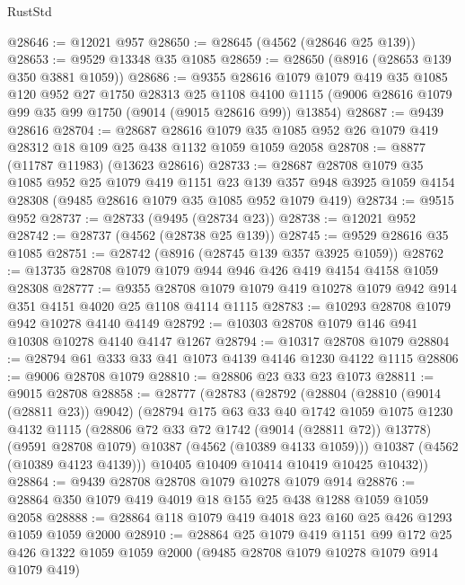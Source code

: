 \begin{lexlean}{RustStd}
\begin{coremodule}
@28646 := @12021 @957
@28650 := @28645 (@4562 (@28646 @25 @139))
@28653 := @9529 @13348 @35 @1085
@28659 := @28650 (@8916 (@28653 @139 @350 @3881 @1059))
@28686 := @9355
    @28616
    @1079
    @1079
    @419
    @35
    @1085
    @120
    @952
    @27
    @1750
    @28313
    @25
    @1108
    @4100
    @1115
    (@9006 @28616 @1079 @99 @35 @99 @1750 (@9014 (@9015 @28616 @99)) @13854)
@28687 := @9439 @28616
@28704 := @28687
    @28616
    @1079
    @35
    @1085
    @952
    @26
    @1079
    @419
    @28312
    @18
    @109
    @25
    @438
    @1132
    @1059
    @1059
    @2058
@28708 := @8877 (@11787 @11983) (@13623 @28616)
@28733 := @28687
    @28708
    @1079
    @35
    @1085
    @952
    @25
    @1079
    @419
    @1151
    @23
    @139
    @357
    @948
    @3925
    @1059
    @4154
    @28308
    (@9485 @28616 @1079 @35 @1085 @952 @1079 @419)
@28734 := @9515 @952
@28737 := @28733 (@9495 (@28734 @23))
@28738 := @12021 @952
@28742 := @28737 (@4562 (@28738 @25 @139))
@28745 := @9529 @28616 @35 @1085
@28751 := @28742 (@8916 (@28745 @139 @357 @3925 @1059))
@28762 := @13735 @28708 @1079 @1079 @944 @946 @426 @419 @4154 @4158 @1059 @28308
@28777 := @9355
    @28708
    @1079
    @1079
    @419
    @10278
    @1079
    @942
    @914
    @351
    @4151
    @4020
    @25
    @1108
    @4114
    @1115
@28783 := @10293 @28708 @1079 @942 @10278 @4140 @4149
@28792 := @10303 @28708 @1079 @146 @941 @10308 @10278 @4140 @4147 @1267
@28794 := @10317 @28708 @1079
@28804 := @28794 @61 @333 @33 @41 @1073 @4139 @4146 @1230 @4122 @1115
@28806 := @9006 @28708 @1079
@28810 := @28806 @23 @33 @23 @1073
@28811 := @9015 @28708
@28858 := @28777
    (@28783
      (@28792
        (@28804
          (@28810 (@9014 (@28811 @23)) @9042)
          (@28794
            @175
            @63
            @33
            @40
            @1742
            @1059
            @1075
            @1230
            @4132
            @1115
            (@28806 @72 @33 @72 @1742 (@9014 (@28811 @72)) @13778)
            (@9591 @28708 @1079)
            @10387
            (@4562 (@10389 @4133 @1059)))
          @10387
          (@4562 (@10389 @4123 @4139)))
        @10405
        @10409
        @10414
        @10419
        @10425
        @10432))
@28864 := @9439 @28708 @28708 @1079 @10278 @1079 @914
@28876 := @28864 @350 @1079 @419 @4019 @18 @155 @25 @438 @1288 @1059 @1059 @2058
@28888 := @28864 @118 @1079 @419 @4018 @23 @160 @25 @426 @1293 @1059 @1059 @2000
@28910 := @28864
    @25
    @1079
    @419
    @1151
    @99
    @172
    @25
    @426
    @1322
    @1059
    @1059
    @2000
    (@9485 @28708 @1079 @10278 @1079 @914 @1079 @419)

\end{coremodule}
\end{lexlean}
